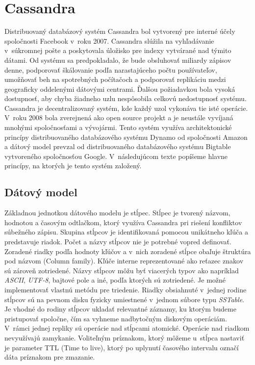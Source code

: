 \documentclass[11pt,twoside,a4paper]{book}
\begin{document}
\chapter{Cassandra}


Distribuovaný databázový systém Cassandra \cite{cassandraW} bol vytvorený pre interné účely spoločnosti Facebook v~roku 2007. Cassandra slúžila na vyhľadávanie v~súkromnej pošte a poskytovala úložisko pre indexy vytvárané nad týmito dátami. Od systému sa predpokladalo, že bude obsluhovať miliardy zápisov denne, podporovať škálovanie podľa narastajúceho počtu používateľov, umožňovať beh na spotrebných počítačoch a podporovať replikáciu medzi geograficky oddelenými dátovými centrami. Ďalšou požiadavkou bola vysoká dostupnosť, aby chyba žiadneho uzlu nespôsobila celkovú nedostupnosť systému. Cassandra je decentralizovaný systém, kde každý uzol vykonáva tie isté operácie. V~roku 2008 bola zverejnená ako open source projekt a je neustále vyvíjaná mnohými spoločnosťami a vývojármi. Tento systém využíva architektonické princípy distribuovaného databázového systému Dynamo \cite{decandia2007dynamo} od spoločnosti Amazon a dátový model prevzal od distribuovaného databázového systému Bigtable \cite{chang2008bigtable} vytvoreného spoločnosťou Google. V~následujúcom texte popíšeme hlavne princípy, na ktorých je tento systém založený.


\section{Dátový model}
Základnou jednotkou dátového modelu je stĺpec. Stĺpec je tvorený názvom, hodnotou a časovým odtlačkom, ktorý využíva Cassandra pri riešení konfliktov súbežného zápisu. Skupina stĺpcov je identifikovaná pomocou unikátneho kľúča a predstavuje riadok. Počet a názvy stĺpcov nie je potrebné vopred definovať. Zoradené riadky podľa hodnoty kľúčov a v~nich zoradené stĺpce obaľuje štruktúra pod názvom \emph{} (Column family). Kľúče interne reprezentované ako reťazec znakov sú zároveň zotriedené. Názvy stĺpcov môžu byť viacerých typov ako napríklad \emph{ASCII}, \emph{UTF-8}, bajtové pole a iné, podľa ktorých sú zotriedené. Je možné implementovať vlastnú metódu pre triedenie. Riadky obsiahnuté v~jednej rodine stĺpcov sú na pevnom disku fyzicky umiestnené v~jednom súbore typu \emph{SSTable}. Je vhodné do rodiny stĺpcov ukladať relevantné záznamy, ku ktorým budeme pristupovať spoločne, čím sa vyhneme nadbytočným diskovým operáciám. V~rámci jednej repliky sú operácie nad stĺpcami atomické. Operácie nad riadkom nevyužívajú zamykanie. Voliteľným príznakom, ktorý môžeme u~stĺpca nastaviť je parameter TTL (Time to live), ktorý po uplynutí časového intervalu označí dáta príznakom pre zmazanie.
\end{document}
